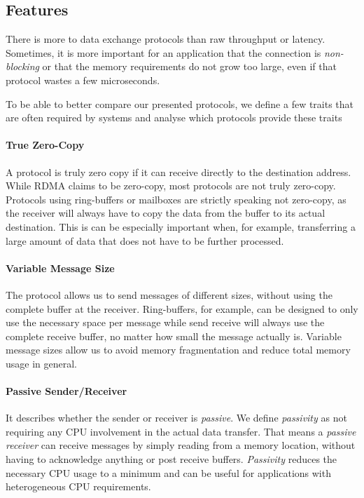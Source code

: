 \subsection{Features} \label{sec:features} 


There is more to data exchange protocols than raw throughput or latency. Sometimes, it is more important for an application
that the connection is \emph{non-blocking} or that the memory requirements do not grow too large, even if that protocol wastes
a few microseconds.

To be able to better compare our presented protocols, we define a few traits that are often required by systems and
analyse which protocols provide these traits

\paragraph{True Zero-Copy} A protocol is truly zero copy if it can receive directly to the destination address. While RDMA 
claims to be zero-copy, most protocols are not truly zero-copy. Protocols using ring-buffers or mailboxes are
strictly speaking not zero-copy, as the receiver will always have to copy the data from the buffer to its actual destination.
This is can be especially important when, for example, transferring a large amount of data that does not have to be further processed.

\paragraph{Variable Message Size} The protocol allows us to send messages of different sizes, without using the 
complete buffer at the receiver. Ring-buffers, for example, can be designed to only use the necessary space per message
while send receive will always use the complete receive buffer, no matter how small the message actually is. Variable
message sizes allow us to avoid memory fragmentation and reduce total memory usage in general.

\paragraph{Passive Sender/Receiver} It describes whether the sender or receiver is \emph{passive}. We define \emph{passivity} as not 
requiring any CPU involvement in the actual data transfer. That means a \emph{passive receiver} can receive messages by
simply reading from a memory location, without having to acknowledge anything or post receive buffers. \emph{Passivity} 
reduces the necessary CPU usage to a minimum and can be useful for applications with heterogeneous CPU requirements.

